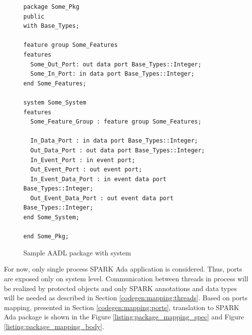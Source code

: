 \begin{figure}
\singlespacing
\begin{lstlisting}[language=aadl, frame=single, gobble=0]
package Some_Pkg
public
with Base_Types;

feature group Some_Features
features
  Some_Out_Port: out data port Base_Types::Integer;
  Some_In_Port: in data port Base_Types::Integer;
end Some_Features;

system Some_System
features
  Some_Feature_Group : feature group Some_Features;
  
  In_Data_Port : in data port Base_Types::Integer;
  Out_Data_Port : out data port Base_Types::Integer;
  In_Event_Port : in event port;
  Out_Event_Port : out event port;
  In_Event_Data_Port : in event data port Base_Types::Integer;
  Out_Event_Data_Port : out event data port Base_Types::Integer;
end Some_System;

end Some_Pkg;
\end{lstlisting}
\doublespacing
\caption{Sample AADL package with system}
\label{listing:aadl_sample}
\end{figure}

For now, only single process SPARK Ada application is considered. Thus, ports are exposed only on system level. Communication between threads in process will be realized by protected objects and only SPARK annotations and data types will be needed as described in Section \ref{codegen:mapping:threads}. Based on ports mapping, presented in Section \ref{codegen:mapping:ports}, translation to SPARK Ada package is shown in the Figure \ref{listing:package_mapping_spec} and Figure \ref{listing:package_mapping_body}. 

